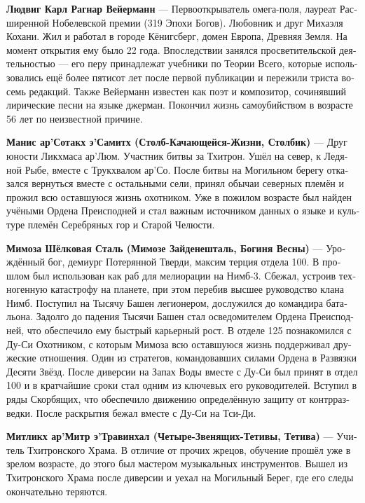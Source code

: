 \documentclass[a4paper,12pt,fleqn]{book}\usepackage{polyglossia}\setdefaultlanguage[babelshorthands=true]{russian}\setotherlanguage{english}\defaultfontfeatures{Ligatures=TeX,Mapping=tex-text}\usepackage{xcolor}\newcommand{\ml}[3]{#2}
\newcommand{\theterm}[3]{\textbf{\hypertarget{#1}{#2}} --- #3}
\begin{document}
{\theterm{wajermann}
{Людвиг Карл Рагнар Вейерманн}
{Первооткрыватель омега-поля, лауреат Расширенной Нобелевской премии (319 Эпохи Богов).
Любовник и друг Михаэля Кохани.
Жил и работал в городе Кёнигсберг, домен Европа, Древняя Земля.
На момент открытия ему было 22 года.
Впоследствии занялся просветительской деятельностью --- его перу принадлежат учебники по Теории Всего, которые использовались ещё более пятисот лет после первой публикации и пережили триста восемь редакций.
Также Вейерманн известен как поэт и композитор, сочинявший лирические песни на языке джерман.
Покончил жизнь самоубийством в возрасте 56 лет по неизвестной причине.}

\theterm{little-pier}
{Манис ар'Сотакх э'Самитх (Столб-Качающейся-Жизни, Столбик)}
{Друг юности Ликхмаса ар'Люм.
Участник битвы за Тхитрон.
Ушёл на север, к Ледяной Рыбе, вместе с Трукхвалом ар'Со.
После битвы на Могильном берегу отказался вернуться вместе с остальными сели, принял обычаи северных племён и прожил всю оставшуюся жизнь охотником.
Уже в пожилом возрасте был найден учёными Ордена Преисподней и стал важным источником данных о языке и культуре племён Серебряных гор и Старой Челюсти.}

\theterm{mimosa} %
{Мимоза Шёлковая Сталь (Мимозе Зайденешталь, Богиня Весны)}
{Урождённый бог, демиург Потерянной Тверди, максим терция отдела 100.
В прошлом был использован как раб для мелиорации на Нимб-3.
Сбежал, устроив техногенную катастрофу на планете, при этом перебив высшее руководство клана Нимб.
Поступил на Тысячу Башен легионером, дослужился до командира батальона.
Задолго до падения Тысячи Башен стал осведомителем Ордена Преисподней, что обеспечило ему быстрый карьерный рост.
В отделе 125 познакомился с Ду-Си Охотником, с которым Мимоза всю оставшуюся жизнь поддерживал дружеские отношения.
Один из стратегов, командовавших силами Ордена в Развязки Десяти Звёзд.
После диверсии на Запах Воды вместе с Ду-Си был принят в отдел 100 и в кратчайшие сроки стал одним из ключевых его руководителей.
Вступил в ряды Скорбящих, что обеспечило движению определённую защиту от контрразведки.
После раскрытия бежал вместе с Ду-Си на Тси-Ди.}

\theterm{mitlikch}
{Митликх ар'Митр э'Травинхал (Четыре-Звенящих-Тетивы, Тетива)}
{Учитель Тхитронского Храма.
В отличие от прочих жрецов, обучение прошёл уже в зрелом возрасте, до этого был мастером музыкальных инструментов.
Вышел из Тхитронского Храма после диверсии и уехал на Могильный Берег, где его следы окончательно теряются.}

}
\end{document}
